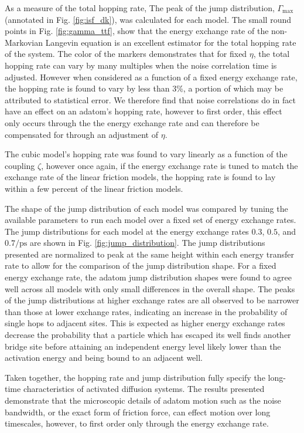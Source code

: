 \documentclass[7pt]{article}
\newcommand{\ips}{\si{\per\pico\second}}
\begin{document}
As a measure of the total hopping rate, The peak of the jump distribution, $\Gamma_{\text{max}}$ (annotated in Fig. \ref{fig:isf_dk}), was calculated for each model. The small round points in Fig. \ref{fig:gamma_ttf}, show that the energy exchange rate of the non-Markovian Langevin equation is an excellent estimator for the total hopping rate of the system. The color of the markers demonstrates that for fixed $\eta$, the total hopping rate can vary by many multiples when the noise correlation time is adjusted. However when considered as a function of a fixed energy exchange rate, the hopping rate is found to vary by less than $3$\%, a portion of which may be attributed to statistical error. We therefore find that noise correlations do in fact have an effect on an adatom's hopping rate, however to first order, this effect only occurs through the the energy exchange rate and can therefore be compensated for through an adjustment of $\eta$.

The cubic model's hopping rate was found to vary linearly as a function of the coupling $\zeta$, however once again, if the energy exchange rate is tuned to match the exchange rate of the linear friction models, the hopping rate is found to lay within a few percent of the linear friction models.

The shape of the jump distribution of each model was compared by tuning the available parameters to run each model over a fixed set of energy exchange rates. The jump distributions for each model at the energy exchange rates $0.3$, $0.5$, and $0.7\ips$ are shown in Fig. \ref{fig:jump_distribution}. The jump distributions presented are normalized to peak at the same height within each energy transfer rate to allow for the comparison of the jump distribution shape. For a fixed energy exchange rate, the adatom jump distribution shapes were found to agree well across all models with only small differences in the overall shape. The peaks of the jump distributions at higher exchange rates are all observed to be narrower than those at lower exchange rates, indicating an increase in the probability of single hops to adjacent sites\cite{Diamant}. This is expected as higher energy exchange rates decrease the probability that a particle which has escaped its well finds another bridge site before attaining an independent energy level likely lower than the activation energy and being bound to an adjacent well.

Taken together, the hopping rate and jump distribution fully specify the long-time characteristics of activated diffusion systems. The results presented demonstrate that the microscopic details of adatom motion such as the noise bandwidth, or the exact form of friction force, can effect motion over long timescales, however, to first order only through the energy exchange rate. 
\end{document}
